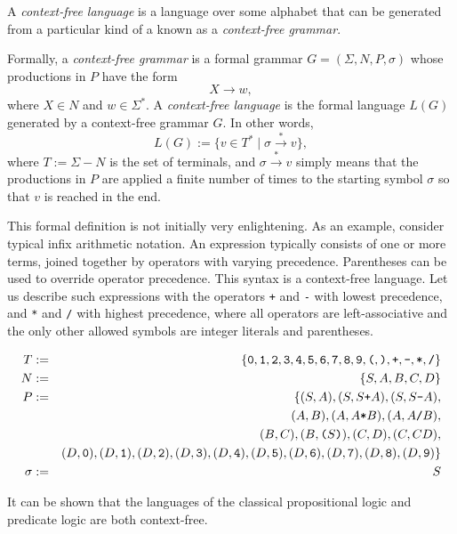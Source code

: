 \documentclass[12pt]{article}
\begin{document}
A \emph{context-free language} is a language over some alphabet that can be generated from a particular kind of a  known as a \emph{context-free grammar}.

Formally, a \emph{context-free grammar} is a formal grammar $G=(\Sigma, N, P, \sigma)$ whose productions in $P$ have the form $$X\to w,$$ where $X\in N$ and $w\in \Sigma^*$.  A \emph{context-free language} is the formal language $L(G)$ generated by a context-free grammar $G$.  In other words,
$$L(G):=\lbrace v\in T^*\mid \sigma\stackrel{*}{\to} v\rbrace,$$
where $T:=\Sigma-N$ is the set of terminals, and $\sigma\stackrel{*}{\to}v$ simply means that the productions in $P$ are applied a finite number of times to the starting symbol $\sigma$ so that $v$ is reached in the end.

This formal definition is not initially very enlightening.  As an example, consider typical infix arithmetic notation.  An expression typically consists of one or more terms, joined together by operators with varying precedence.
Parentheses can be used to override operator precedence.  This syntax is a context-free language.  Let us describe such expressions with the operators \verb.+. and \verb.-. with lowest precedence, and \verb.*. and \verb./. with highest precedence, where all operators are left-associative and the only other allowed symbols are integer literals and parentheses.

\begin{eqnarray}
T & := & \left\{\verb.0., \verb.1., \verb.2., \verb.3., \verb.4.,
\verb.5., \verb.6., \verb.7., \verb.8., \verb.9., \verb.(., \verb.).,
\verb.+., \verb.-., \verb.*., \verb./. \right\} \nonumber \\
N & := & \left\{ S, A, B, C, D \right\} \nonumber \\
P & := & \{ (S, A), (S, S\verb.+.A), (S, S\verb.-.A), \nonumber \\
&& (A, B), (A, A\verb.*.B), (A, A\verb./.B), \nonumber \\
&& (B, C), (B, \verb.(.S\verb.).), \nonumber
(C, D), (C, CD), \nonumber \\
  &    &
(D, \verb.0.),
(D, \verb.1.),
(D, \verb.2.),
(D, \verb.3.),
(D, \verb.4.),
(D, \verb.5.),
(D, \verb.6.),
(D, \verb.7.),
(D, \verb.8.),
(D, \verb.9.)
\} \nonumber \\
\sigma & := & S \nonumber
\end{eqnarray}

It can be shown that the languages of the classical propositional logic and predicate logic are both context-free.
\end{document}
